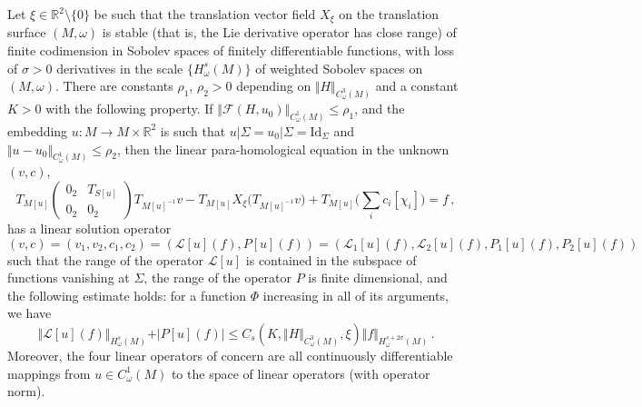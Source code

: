 \documentclass[10pt,a4paper]{amsart}
\newcommand \R {{ \mathbb R}}
\begin{document}
\begin{lemma}  
\label{lemma:solutions}
Let $\xi \in \R^2 \setminus \{0\}$ be such that the translation vector field $X_\xi$ on the translation surface $(M, \omega)$ is stable
(that is, the Lie derivative operator has close range) of finite codimension in Sobolev spaces of finitely differentiable functions, with loss of $\sigma>0$
derivatives in the scale $\{H^s_\omega(M) \}$ of weighted Sobolev spaces on $(M, \omega)$.
There are constants $\rho_1$, $\rho_2>0$ depending on $\Vert H \Vert_{C^3_\omega(M)}$  and a constant $K>0$ with the following property. If  $\Vert \mathcal F (H, u_0)\Vert_{C^1_\omega(M)} \leq \rho_1$, and the embedding $u: M \to M \times \R^2$  is such that $u\vert \Sigma = u_0 \vert \Sigma= \text{Id}_\Sigma$ and $\Vert u- u_0\Vert_{C^1_\omega(M)} \leq \rho_2$, then the linear para-homological equation in the unknown $(v, c)$,
$$
T_{M[u]} \begin{pmatrix} 0_2 & T_{S[u]} \\ 0_2 & 0_2 \end{pmatrix} T_{M[u]^{-1}}  v - 
T_{ M[u] } X_\xi \Big(T_{M[u]^{-1} }  v \Big)  + T_{M[u]}\Big( \sum_i  c_i [\chi_i] \Big) = f \,,
$$
has a linear solution operator 
$$
(v, c) = (v_1, v_2, c_1, c_2) =  (\mathcal L[u] (f),  P[u] (f)) =(\mathcal L_1[u] (f), \mathcal L_2[u] (f),  P_1[u] (f), P_2[u] (f) )
$$
such that the range of the operator  $\mathcal L[u]$ is contained in the subspace of functions vanishing at $\Sigma$, the range of the operator $P$
is finite dimensional, and the following estimate holds: for a function $\Phi$ increasing in all of its arguments, we have
$$
\Vert \mathcal L [u] (f) \Vert_{H^s_\omega(M)} + \vert P[u] (f) \vert \leq  C_s (K, \Vert H\Vert_{C^3_\omega(M)}, \xi) \Vert  f \Vert_{H^{s+2\sigma}_\omega(M)} \,.
$$
Moreover, the four linear operators of concern are all continuously differentiable mappings from $u\in C^1_\omega(M)$ to the space of linear operators (with operator norm). 
\end{lemma} 
\end{document}
